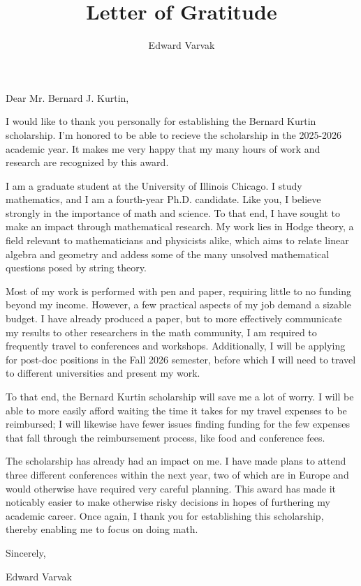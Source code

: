 \documentclass[12pt]{amsart}
\title{Letter of Gratitude}
\author{Edward Varvak}
\begin{document}

\noindent Dear Mr. Bernard J. Kurtin, \newline \newline

\noindent I would like to thank you personally for establishing the Bernard Kurtin scholarship. 
I'm honored to be able to recieve the scholarship in the 2025-2026 academic year. It makes 
me very happy that my many hours of work and research are recognized by this award.
\newline

\noindent I am a graduate student at the University of Illinois Chicago. I study mathematics, 
and I am a fourth-year Ph.D. candidate. Like you, I believe strongly in the importance 
of math and science. To that end, I have sought to make an impact through mathematical research.
My work lies in Hodge theory, a field relevant to mathematicians and physicists alike,
which aims to relate linear algebra and geometry and addess some of the many unsolved
mathematical questions posed by string theory. \newline

\noindent Most of my work is performed with pen and paper, requiring little to no funding
beyond my income. However, a few practical aspects of my job demand a sizable budget.
I have already produced a paper, but to more effectively communicate my results to other 
researchers in the math community, I am required to frequently travel to conferences and 
workshops. Additionally, I will be applying for post-doc positions in the Fall 2026
semester, before which I will need to travel to different universities and present 
my work. \newline

\noindent To that end, the Bernard Kurtin scholarship will save me a lot of worry. I will be able 
to more easily afford waiting the time it takes for my travel expenses to be reimbursed; 
I will likewise have fewer issues finding funding for the few expenses that fall through
the reimbursement process, like food and conference fees. \newline

\noindent The scholarship has already had an impact on me. I have made plans to 
attend three different conferences within the next year, two of which are in Europe 
and would otherwise have required very careful planning. This award has made it 
noticably easier to make otherwise risky decisions in hopes of furthering my academic 
career. Once again, I thank you for establishing this scholarship, thereby enabling me
to focus on doing math.\newline \newline

\noindent Sincerely,\newline

\noindent Edward Varvak
\end{document}
